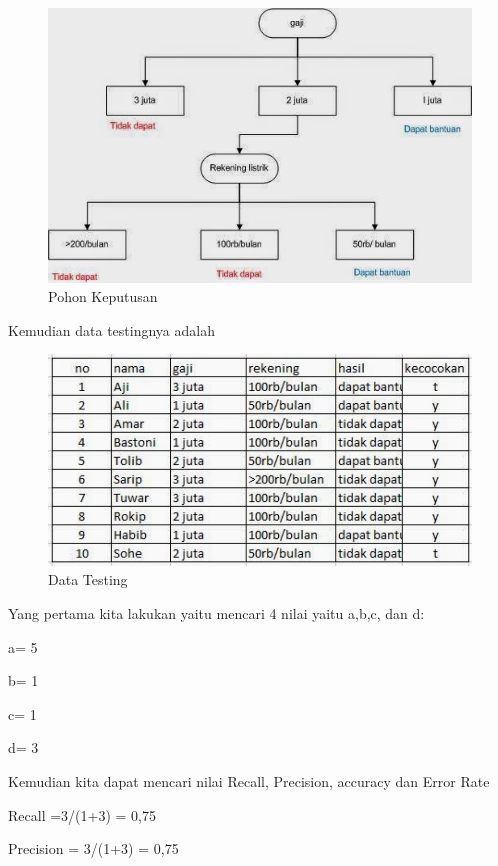 \begin{enumerate}
\begin{enumerate}
\begin{figure}[ht]
\centering
\includegraphics[scale=0.5]{figures/Chapter3AnnisaFathoroni2.jpg}
\caption{Pohon Keputusan}
\label{contoh}
\end{figure}
\end{enumerate}

Kemudian data testingnya adalah

\begin{figure}[ht]
\centering
\includegraphics[scale=0.5]{figures/Chapter3AnnisaFathoroni3.jpg}
\caption{Data Testing}
\label{contoh}
\end{figure}

Yang pertama kita lakukan yaitu mencari 4 nilai yaitu a,b,c, dan d:

a= 5

b= 1

c= 1

d= 3

Kemudian kita dapat mencari nilai Recall, Precision, accuracy dan Error Rate

Recall =3/(1+3) = 0,75

Precision = 3/(1+3) = 0,75


\end{enumerate}
